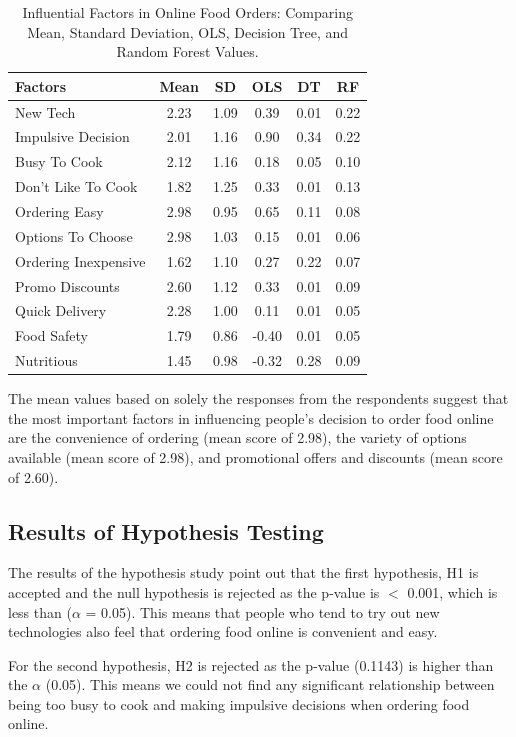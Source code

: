 \documentclass[a4paper,fleqn]{cas-sc}
\begin{document}
\begin{table}[htb]
\caption{Influential Factors in Online Food Orders: Comparing Mean, Standard Deviation, OLS, Decision Tree, and Random Forest Values.}
\label{tab:factors_results}
\begin{tabular*}{\linewidth}{@{\extracolsep{\fill}}lccccc@{}}
\hline
    Factors & Mean & SD & OLS & DT & RF \\
    \hline
    New Tech & 2.23 & 1.09 & 0.39 & 0.01 & 0.22 \\
    Impulsive Decision & 2.01 & 1.16 & 0.90 & 0.34 & 0.22 \\
    Busy To Cook & 2.12 & 1.16 & 0.18 & 0.05 & 0.10 \\
    Don't Like To Cook & 1.82 & 1.25 & 0.33 & 0.01 & 0.13 \\
    Ordering Easy & 2.98 & 0.95 & 0.65 & 0.11 & 0.08 \\
    Options To Choose & 2.98 & 1.03 & 0.15 & 0.01 & 0.06 \\
    Ordering Inexpensive & 1.62 & 1.10 & 0.27 & 0.22 & 0.07 \\
    Promo Discounts & 2.60 & 1.12 & 0.33 & 0.01 & 0.09 \\
    Quick Delivery & 2.28 & 1.00 & 0.11 & 0.01 & 0.05 \\
    Food Safety & 1.79 & 0.86 & -0.40 & 0.01 & 0.05 \\
    Nutritious & 1.45 & 0.98 & -0.32 & 0.28 & 0.09 \\
    \hline
\end{tabular*}
\end{table}

The mean values based on solely the responses from the respondents suggest that the most important factors in influencing people's decision to order food online are the convenience of ordering (mean score of 2.98), the variety of options available (mean score of 2.98), and promotional offers and discounts (mean score of 2.60).

\subsection{Results of Hypothesis Testing}
The results of the hypothesis study point out that the first hypothesis, H1 is accepted and the null hypothesis is rejected as the p-value is $<$ 0.001, which is less than ($\alpha$ = 0.05). This means that people who tend to try out new technologies also feel that ordering food online is convenient and easy. 

For the second hypothesis, H2 is rejected as the p-value (0.1143) is higher than the $\alpha$ (0.05). This means we could not find any significant relationship between being too busy to cook and making impulsive decisions when ordering food online. 
\end{document}
